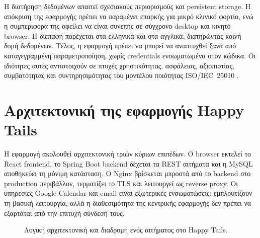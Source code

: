 Η διατήρηση δεδομένων απαιτεί σχεσιακούς περιορισμούς και persistent storage.
Η απόκριση της εφαρμογής πρέπει να παραμένει επαρκής για μικρό κλινικό φορτίο,
ενώ η συμπεριφορά της οφείλει να είναι συνεπής σε σύγχρονο desktop και κινητό
browser. Η διεπαφή παρέχεται στα ελληνικά και στα αγγλικά, διατηρώντας κοινή
δομή δεδομένων. Τέλος, η εφαρμογή πρέπει να μπορεί να αναπτυχθεί ξανά από
καταγεγραμμένη παραμετροποίηση, χωρίς credentials ενσωματωμένα στον κώδικα.
Οι ιδιότητες αυτές αντιστοιχούν σε πτυχές χρηστικότητας, ασφάλειας,
αξιοπιστίας, συμβατότητας και συντηρησιμότητας του μοντέλου ποιότητας
ISO/IEC~25010 \cite{iso25010-2023}.

\section{Αρχιτεκτονική της εφαρμογής Happy Tails}

Η εφαρμογή ακολουθεί αρχιτεκτονική τριών κύριων επιπέδων. Ο browser εκτελεί
το React frontend, το Spring Boot backend δέχεται τα REST αιτήματα και η
MySQL αποθηκεύει τη μόνιμη κατάσταση. Ο Nginx βρίσκεται μπροστά από το
backend στο production περιβάλλον, τερματίζει το TLS και λειτουργεί ως
reverse proxy. Οι υπηρεσίες Google Calendar και email είναι εξωτερικές
ενσωματώσεις: εμπλουτίζουν τη βασική λειτουργία, αλλά η διαθεσιμότητα της
κεντρικής εφαρμογής δεν πρέπει να εξαρτάται από την επιτυχή σύνδεσή τους.

\begin{figure}[htbp]
\caption{Λογική αρχιτεκτονική και διαδρομή ενός αιτήματος στο Happy Tails.}
\label{fig:logical-architecture}
\centering
{}
\end{figure}

